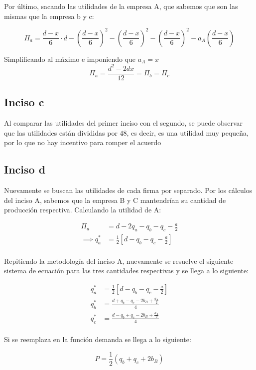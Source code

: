 \documentclass[
	spanish, %
	letterpaper, oneside
]{article}
\begin{document}
Por último, sacando las utilidades de la empresa A, que sabemos que son las mismas que la empresa b y c:

	$$\Pi_a = \frac{d-x}{6}\cdot d - (\frac{d-x}{6})^2 - (\frac{d-x}{6})^2 - (\frac{d-x}{6})^2 - a_A(\frac{d-x}{6})$$

Simplificando al máximo e imponiendo que  $a_A = x$\\

$$\Pi_a = \frac{d^2-2dx}{12} = \Pi_b = \Pi_c$$


\subsection{Inciso c}

Al comparar las utilidades del primer inciso con el segundo, se puede observar que las utilidades están divididas por $48$, es decir, es una utilidad muy pequeña, por lo que no hay incentivo para romper el acuerdo

\subsection{Inciso d}

Nuevamente se buscan las utilidades de cada firma por separado. Por los cálculos del inciso A, sabemos que la empresa B y C mantendrían su cantidad de producción respectiva. Calculando la utilidad de A:

\begin{align*}
\Pi_a &=d-2q_a-q_b-q_c-\frac{a}{2}\\
\implies q_{a}^{*} &=\frac{1}{2}\left[d-q_b-q_c-\frac{a}{2}\right]
\end{align*}\\

Repitiendo la metodología del inciso A, nuevamente se resuelve el siguiente sistema de ecuación para las tres cantidades respectivas y se llega a lo siguiente:

\begin{align*}
	q_{a}^{*} &=\frac{1}{2}\left[d-q_b-q_c-\frac{a}{2}\right]\\
	q_{b}^{*}&=\frac{d+q_b - q_c - 2b_B + \frac{a_A}{2}}{4}\\
	q_{c}^{*}&=\frac{d-q_b+q_c-2b_B + \frac{a_A}{2}}{4}
\end{align*}\\

Si se reemplaza en la función demanda se llega a lo siguiente:

$$P=\frac{1}{2}(q_b + q_c + 2b_B)$$
\end{document}
